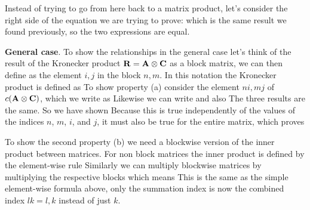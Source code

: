 Instead of trying to go from here back to a matrix product, let's consider the right side of the equation we are trying to prove:
which is the same result we found previously, so the two expressions are equal. 

{\bf General case}. 
To show the relationships in the general case let's think of the result of the Kronecker product ${\bf R} = {\bf A} \otimes {\bf C}$ as a block matrix, we can then define 
as the element $i,j$ in the block $n,m$. In this notation the Kronecker product is defined as 
To show property (a) consider the element $ni,mj$ of $c({\bf A} \otimes {\bf C})$, which we write as 
Likewise we can write
and also 
The three results are the same. So we have shown 
Because this is true independently of the values of the indices $n$, $m$, $i$, and $j$, it must also be true for the entire matrix, which proves

To show the second property (b) we need a blockwise version of the inner product between matrices. For non block matrices the inner product is defined by the element-wise rule 
Similarly we can multiply blockwise matrices by multiplying the respective blocks 
which means 
This is the same as the simple element-wise formula above, only the summation index is now the combined index $lk=l,k$ instead of just $k$.

